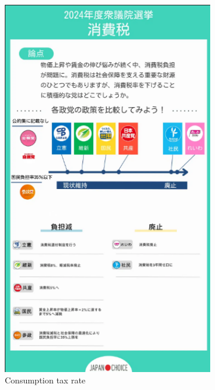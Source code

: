 \documentclass[final,5p,times,twocolumn,authoryear]{elsarticle}
\begin{document}
\begin{figure}[ht]
    \centering
    \begin{subfigure}[t]{0.22\textwidth}
        \centering
        \includegraphics[width=\linewidth]{figs/mielka/consumptiontax.png}
        \caption{Consumption tax rate}
        \label{fig:consumptiontax}
    \end{subfigure}\hfill
    \begin{subfigure}[t]{0.22\textwidth}
        \centering

\end{subfigure}
\end{figure}
\end{document}

